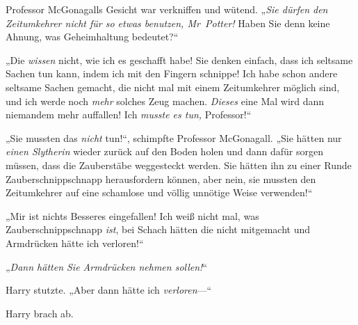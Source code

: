 Professor McGonagalls Gesicht war verkniffen und wütend. „\emph{Sie dürfen den Zeitumkehrer nicht für so etwas benutzen, Mr~Potter!} Haben Sie denn keine Ahnung, was Geheimhaltung bedeutet?“

„Die \emph{wissen} nicht, wie ich es geschafft habe! Sie denken einfach, dass ich seltsame Sachen tun kann, indem ich mit den Fingern schnippe! Ich habe schon andere seltsame Sachen gemacht, die nicht mal mit einem Zeitumkehrer möglich sind, und ich werde noch \emph{mehr} solches Zeug machen. \emph{Dieses} eine Mal wird dann niemandem mehr auffallen! Ich \emph{musste es tun,} Professor!“

„Sie mussten das \emph{nicht} tun!“, schimpfte Professor McGonagall. „Sie hätten nur \emph{einen Slytherin} wieder zurück auf den Boden holen und dann dafür sorgen müssen, dass die Zauberstäbe weggesteckt werden. Sie hätten ihn zu einer Runde Zauberschnippschnapp herausfordern können, aber nein, sie mussten den Zeitumkehrer auf eine schamlose und völlig unnötige Weise verwenden!“

„Mir ist nichts Besseres eingefallen! Ich weiß nicht mal, was Zauberschnippschnapp \emph{ist}, bei Schach hätten die nicht mitgemacht und Armdrücken hätte ich verloren!“

„\emph{Dann hätten Sie Armdrücken nehmen sollen!}“

Harry stutzte. „Aber dann hätte ich \emph{verloren}—“

Harry brach ab.

